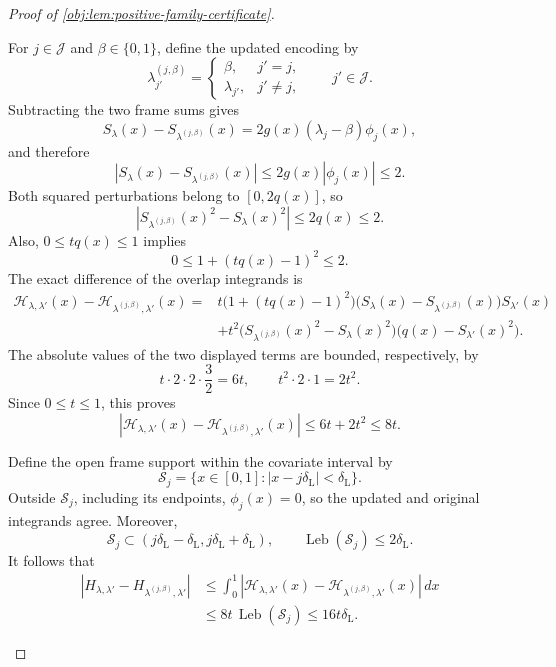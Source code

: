 \begin{proof}[Proof of \cref{obj:lem:positive-family-certificate}]
\begin{enumerate}
For \(j\in\mathcal J\) and \(\beta\in\{0,1\}\), define the updated
encoding by
\[
\lambda^{(j,\beta)}_{j'}=
\begin{cases}
\beta,&j'=j,\\
\lambda_{j'},&j'\ne j,
\end{cases}
\qquad j'\in\mathcal J.
\]
Subtracting the two frame sums gives
\[
S_\lambda(x)-S_{\lambda^{(j,\beta)}}(x)
=2g(x)(\lambda_j-\beta)\phi_j(x),
\]
and therefore
\[
|S_\lambda(x)-S_{\lambda^{(j,\beta)}}(x)|
\le2g(x)|\phi_j(x)|\le2.
\]
Both squared perturbations belong to \([0,2q(x)]\), so
\[
\left|S_{\lambda^{(j,\beta)}}(x)^2-S_\lambda(x)^2\right|
\le2q(x)\le2.
\]
Also, \(0\le tq(x)\le1\) implies
\[
0\le1+(tq(x)-1)^2\le2.
\]
The exact difference of the overlap integrands is
\[
\begin{aligned}
\mathcal H_{\lambda,\lambda'}(x)
-\mathcal H_{\lambda^{(j,\beta)},\lambda'}(x)
={}&t\bigl(1+(tq(x)-1)^2\bigr)
   \bigl(S_\lambda(x)-S_{\lambda^{(j,\beta)}}(x)\bigr)
   S_{\lambda'}(x)\\
&+t^2\bigl(S_{\lambda^{(j,\beta)}}(x)^2-S_\lambda(x)^2\bigr)
       \bigl(q(x)-S_{\lambda'}(x)^2\bigr).
\end{aligned}
\]
The absolute values of the two displayed terms are bounded, respectively,
by
\[
t\cdot2\cdot2\cdot\frac32=6t,
\qquad
t^2\cdot2\cdot1=2t^2.
\]
Since \(0\le t\le1\), this proves
\[
\left|\mathcal H_{\lambda,\lambda'}(x)
-\mathcal H_{\lambda^{(j,\beta)},\lambda'}(x)\right|
\le6t+2t^2\le8t.
\]

Define the open frame support within the covariate interval by
\[
\mathcal S_j=\{x\in[0,1]:|x-j\delta_{\mathrm L}|
                                      <\delta_{\mathrm L}\}.
\]
Outside \(\mathcal S_j\), including its endpoints,
\(\phi_j(x)=0\), so the updated and original integrands agree.
Moreover,
\[
\mathcal S_j\subset
(j\delta_{\mathrm L}-\delta_{\mathrm L},
 j\delta_{\mathrm L}+\delta_{\mathrm L}),
\qquad
\operatorname{Leb}(\mathcal S_j)\le2\delta_{\mathrm L}.
\]
It follows that
\[
\begin{aligned}
|H_{\lambda,\lambda'}-H_{\lambda^{(j,\beta)},\lambda'}|
&\le\int_0^1
 \left|\mathcal H_{\lambda,\lambda'}(x)
       -\mathcal H_{\lambda^{(j,\beta)},\lambda'}(x)\right|\,dx\\
&\le8t\,\operatorname{Leb}(\mathcal S_j)
\le16t\delta_{\mathrm L}.
\end{aligned}
\]


\end{enumerate}
\end{proof}
